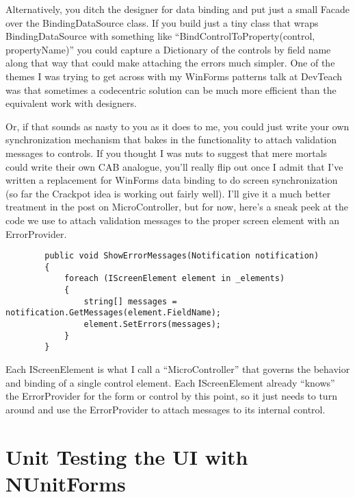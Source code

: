 \documentclass{article}
\begin{document}
{Alternatively, you ditch the designer for data binding and put just a small Facade over the BindingDataSource class.  If you build just a tiny class that wraps BindingDataSource with something like “BindControlToProperty(control, propertyName)” you could capture a Dictionary of the controls by field name along that way that could make attaching the errors much simpler.  One of the themes I was trying to get across with my WinForms patterns talk at DevTeach was that sometimes a codecentric solution can be much more efficient than the equivalent work with designers.

Or, if that sounds as nasty to you as it does to me, you could just write your own synchronization mechanism that bakes in the functionality to attach validation messages to controls.  If you thought I was nuts to suggest that mere mortals could write their own CAB analogue, you'll really flip out once I admit that I've written a replacement for WinForms data binding to do screen synchronization (so far the Crackpot idea is working out fairly well).  I'll give it a much better treatment in the post on MicroController, but for now, here's a sneak peek at the code we use to attach validation messages to the proper screen element with an ErrorProvider.

 \begin{lstlisting}
        public void ShowErrorMessages(Notification notification)
        {
            foreach (IScreenElement element in _elements)
            {
                string[] messages = notification.GetMessages(element.FieldName);
                element.SetErrors(messages);
            }
        }
\end{lstlisting}		

Each IScreenElement is what I call a “MicroController” that governs the behavior and binding of a single control element.  Each IScreenElement already “knows” the ErrorProvider for the form or control by this point, so it just needs to turn around and use the ErrorProvider to attach messages to its internal control.

\section{ Unit Testing the UI with NUnitForms } 

}
\end{document}
